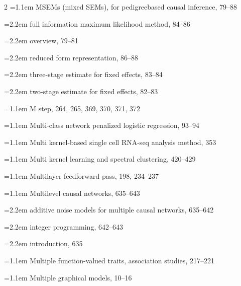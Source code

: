 \begin{multicols}{2}
\noindent\hangindent=1.1em MSEMs (mixed SEMs), for pedigreebased causal inference, 79--88\par
\noindent\hangindent=2.2em \hspace*{1.1em}full information maximum likelihood method, 84--86\par
\noindent\hangindent=2.2em \hspace*{1.1em}overview, 79--81\par
\noindent\hangindent=2.2em \hspace*{1.1em}reduced form representation, 86--88\par
\noindent\hangindent=2.2em \hspace*{1.1em}three-stage estimate for fixed effects, 83--84\par
\noindent\hangindent=2.2em \hspace*{1.1em}two-stage estimate for fixed effects, 82--83\par
\noindent\hangindent=1.1em M step, 264, 265, 369, 370, 371, 372\par
\noindent\hangindent=1.1em Multi-class network penalized logistic regression, 93--94\par
\noindent\hangindent=1.1em Multi kernel-based single cell RNA-seq analysis method, 353\par
\noindent\hangindent=1.1em Multi kernel learning and spectral clustering, 420--429\par
\noindent\hangindent=1.1em Multilayer feedforward pass, 198, 234--237\par
\noindent\hangindent=1.1em Multilevel causal networks, 635--643\par
\noindent\hangindent=2.2em \hspace*{1.1em}additive noise models for multiple causal networks, 635--642\par
\noindent\hangindent=2.2em \hspace*{1.1em}integer programming, 642--643\par
\noindent\hangindent=2.2em \hspace*{1.1em}introduction, 635\par
\noindent\hangindent=1.1em Multiple function-valued traits, association studies, 217--221\par
\noindent\hangindent=1.1em Multiple graphical models, 10--16\par

\end{multicols}
